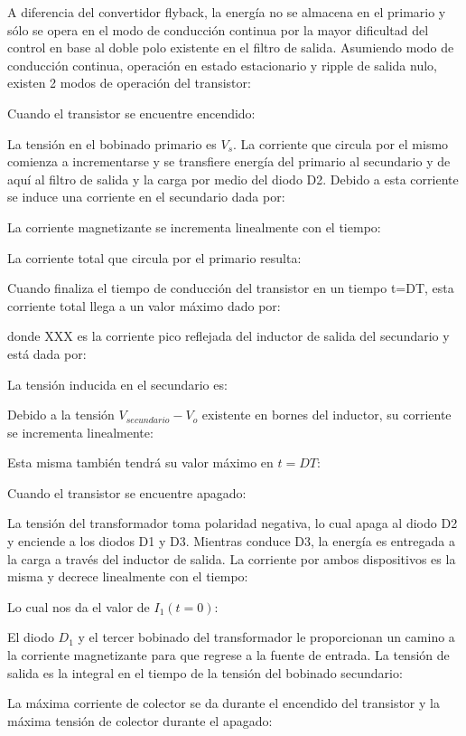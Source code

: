 A diferencia del convertidor flyback, la energía no se almacena en el primario y sólo se opera 
en el modo de conducción continua por la mayor dificultad del control en base al doble polo existente en el filtro de salida. 
Asumiendo modo de conducción continua, operación en estado estacionario y ripple de salida nulo, 
existen 2 modos de operación del transistor:

Cuando el transistor se encuentre encendido:

La tensión en el bobinado primario es $V_s$. La corriente que circula por el mismo comienza a incrementarse 
y se transfiere energía del primario al secundario y de aquí al filtro de salida y la carga por medio del diodo D2. 
Debido a esta corriente se induce una corriente en el secundario dada por:

La corriente magnetizante se incrementa linealmente con el tiempo:

La corriente total que circula por el primario resulta:

Cuando finaliza el tiempo de conducción del transistor en un tiempo t=DT, esta corriente total llega a un valor máximo dado por:

donde XXX es la corriente pico reflejada del inductor de salida del secundario y está dada por:

La tensión inducida en el secundario es:

Debido a la tensión $V_{secundario}-V_o$ existente en bornes del inductor, su corriente se incrementa linealmente:

Esta misma también tendrá su valor máximo en $t=DT$:


Cuando el transistor se encuentre apagado:

La tensión del transformador toma polaridad negativa, lo cual apaga al diodo D2 y enciende a los diodos D1 y D3. 
Mientras conduce D3, la energía es entregada a la carga a través del inductor de salida. 
La corriente por ambos dispositivos es la misma y decrece linealmente con el tiempo:

Lo cual nos da el valor de $I_1(t=0)$:


El diodo $D_1$ y el tercer bobinado del transformador le proporcionan un camino 
a la corriente magnetizante para que regrese a la fuente de entrada. 
La tensión de salida es la integral en el tiempo de la tensión del bobinado secundario:

La máxima corriente de colector se da durante el encendido del transistor y la máxima tensión de colector durante el apagado:


